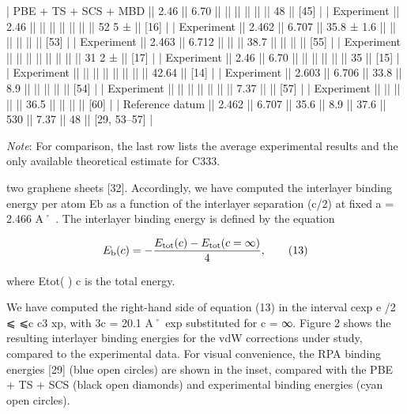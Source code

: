 \documentclass{article}
\begin{document}
| PBE + TS + SCS + MBD || 2.46   || 6.70   ||            ||       ||           ||             ||            || 48          || [45]        |
| Experiment           || 2.46   ||        ||            ||       ||           ||             ||            || 52 5 ±      || [16]        |
| Experiment           || 2.462  || 6.707  || 35.8 ± 1.6 ||       ||           ||             ||            ||             || [53]        |
| Experiment           || 2.463  || 6.712  ||            ||       || 38.7      ||             ||            ||             || [55]        |
| Experiment           ||        ||        ||            ||       ||           ||             ||            || 31 2 ±      || [17]        |
| Experiment           || 2.46   || 6.70   ||            ||       ||           ||             ||            || 35          || [15]        |
| Experiment           ||        ||        ||            ||       ||           ||             ||            || 42.64       || [14]        |
| Experiment           || 2.603  || 6.706  || 33.8       || 8.9   ||           ||             ||            ||             || [54]        |
| Experiment           ||        ||        ||            ||       ||           ||             || 7.37       ||             || [57]        |
| Experiment           ||        ||        ||            ||       || 36.5      ||             ||            ||             || [60]        |
| Reference datum      || 2.462  || 6.707  || 35.6       || 8.9   || 37.6      || 530         || 7.37       || 48          || [29, 53–57] |

\textit{Note}: For comparison, the last row lists the average experimental results and the only available theoretical estimate for C333.

two graphene sheets [32]. Accordingly, we have computed the interlayer binding energy per atom Eb as a function of the interlayer separation (c/2) at fixed a = 2.466 A˚ . The interlayer binding energy is defined by the equation

$$E_{\rm b}(c)=-\frac{E_{\rm tot}(c)-E_{\rm tot}(c=\infty)}{4},\tag{13}$$

where Etot( ) c is the total energy.

We have computed the right-hand side of equation (13) in the interval cexp e /2 ⩽ ⩽c c3 xp, with 3c = 20.1 A˚ exp substituted for c = ∞. Figure 2 shows the resulting interlayer binding energies for the vdW corrections under study, compared to the experimental data. For visual convenience, the RPA binding energies [29] (blue open circles) are shown in the inset, compared with the PBE + TS + SCS (black open diamonds) and experimental binding energies (cyan open circles).
\end{document}
